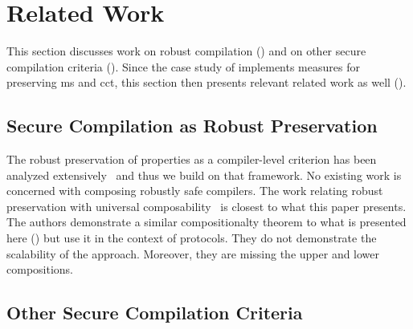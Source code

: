 \documentclass[utf8,acmsmall,review,screen,dvipsnames,anonymous]{acmart}
\begin{document}
\section{Related Work}\label{sec:relwork}

This section discusses work on robust compilation () and on other secure compilation criteria ().
Since the case study of  implements measures for preserving \gls{ms} and \gls{cct}, this section then presents relevant related work as well ().

\subsection{Secure Compilation as Robust Preservation}\label{subsec:relw:seccomprtp}

The robust preservation of properties as a compiler-level criterion has been analyzed extensively~\cite{abate2019jour,patrignani2021rsc,abate2021extacc,patrignani2019survey} and thus we build on that framework.
No existing work is concerned with composing robustly safe compilers.
The work relating robust preservation with universal composability~\cite{patrignani2022universal} is closest to what this paper presents.
The authors demonstrate a similar compositionalty theorem to what is presented here () but use it in the context of protocols.
They do not demonstrate the scalability of the approach.
Moreover, they are missing the upper and lower compositions.

\subsection{Other Secure Compilation Criteria}\label{subsec:relw:seccompcrit}
\end{document}
